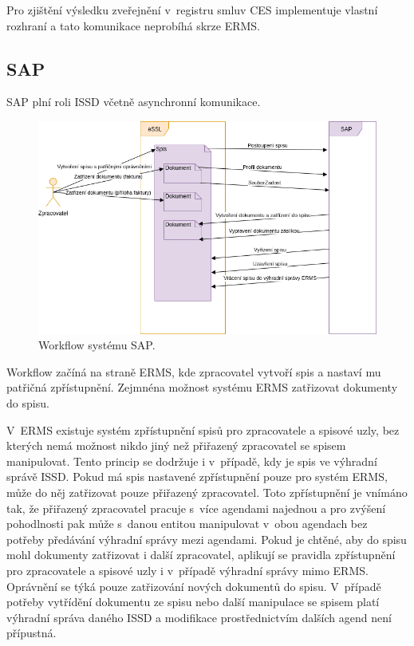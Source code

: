 \documentclass[
  master,
  field=ainfp,
  biblatex,
  language=czech,
  glossaries,
  theorems=false,
  index
]{kidiplom}
\begin{document}
Pro zjištění výsledku zveřejnění v~registru smluv CES implementuje vlastní rozhraní a tato komunikace neprobíhá skrze ERMS.


\subsection{SAP}


\gls{SAP} plní roli ISSD včetně asynchronní komunikace.

\begin{figure}[h]
  \centerline{\includegraphics[width=0.9\linewidth]{./images/SAPworkflow.png}} 
  \caption{Workflow systému SAP.} 
\end{figure}


Workflow začíná na straně ERMS, kde zpracovatel vytvoří spis a nastaví mu patřičná zpřístupnění. Zejmnéna možnost systému ERMS zatřizovat dokumenty do spisu.

V~ERMS existuje systém zpřístupnění spisů pro zpracovatele a spisové uzly, bez kterých nemá možnost nikdo jiný než přiřazený zpracovatel se spisem manipulovat. Tento princip se dodržuje i v~případě, kdy je spis ve výhradní správě ISSD. Pokud má spis nastavené zpřístupnění pouze pro systém ERMS, může do něj zatřizovat pouze přiřazený zpracovatel. Toto zpřístupnění je vnímáno tak, že přiřazený zpracovatel pracuje s~více agendami najednou a pro zvýšení pohodlnosti pak může s~danou entitou manipulovat v~obou agendach bez potřeby předávání výhradní správy mezi agendami. Pokud je chtěné, aby do spisu mohl dokumenty zatřizovat i další zpracovatel, aplikují se pravidla zpřístupnění pro zpracovatele a spisové uzly i v~případě výhradní správy mimo ERMS. Oprávnění se týká pouze zatřizování nových dokumentů do spisu. V~případě potřeby vytřídění dokumentu ze spisu nebo další manipulace se spisem platí výhradní správa daného ISSD a modifikace prostřednictvím dalších agend není přípustná.
\end{document}
